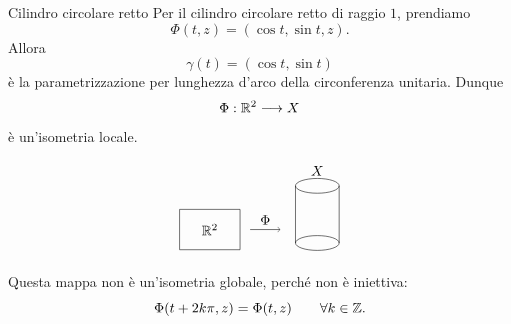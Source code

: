 \documentclass[a4paper]{article}
\begin{document}
\begin{snippetexample}{Cilindro circolare retto}
Per il cilindro circolare retto di raggio \(1\), prendiamo
\[
    \Phi(t,z)=(\cos t,\sin t,z).
\]
Allora
\[
    \gamma(t)=(\cos t,\sin t)
\]
è la parametrizzazione per lunghezza d'arco della circonferenza unitaria. Dunque
\[
    \Phi:\mathbb{R}^2\longrightarrow X
\]
è un'isometria locale.

\[
    \begin{tikzpicture}[scale=0.85]
        \draw (0,0) rectangle (1.8,1.2);
        \node at (0.9,0.6) {\(\realnumbers^2\)};
        \draw[->] (2.1,0.6) -- (3.0,0.6) node[midway,above] {\(\Phi\)};
        \draw (4.1,0.2) ellipse (0.65 and 0.22);
        \draw (4.1,1.9) ellipse (0.65 and 0.22);
        \draw (3.45,0.2) -- (3.45,1.9);
        \draw (4.75,0.2) -- (4.75,1.9);
        \node at (4.1,2.35) {\(X\)};
    \end{tikzpicture}
\]

Questa mappa non è un'isometria globale, perché non è iniettiva:
\[
    \Phi(t+2k\pi,z)=\Phi(t,z)
    \qquad
    \forall k\in\mathbb{Z}.
\]
\end{snippetexample}
\end{document}
